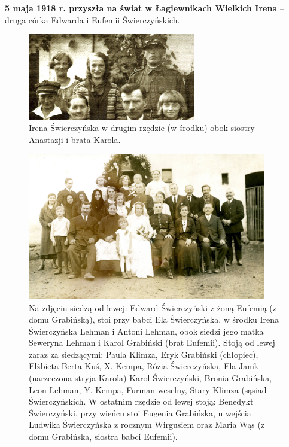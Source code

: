 \textbf{5 maja 1918 r. przyszła na świat w Łagiewnikach Wielkich Irena} -- druga córka Edwarda i Eufemii Świerczyńskich.

\begin{figure}[!h]
\begin{center}
\includegraphics[width=0.65\textwidth]{photo/irena_swierczynska_1.jpg}
\caption[Irena Świerczyńska obok siostry Anastazji i brata Karola]{Irena Świerczyńska w drugim rzędzie (w środku) obok siostry Anastazji i brata Karola.}
\label{rys:irena_swierczynska_1}
\end{center}
\end{figure}

\begin{figure}[!h]
\begin{center}
\includegraphics[width=0.93\textwidth]{photo/irena_antoni_lehman_slub.jpg}
\caption[Ślub Ireny i Antoniego Lehmanów]{Na zdjęciu siedzą od lewej: Edward Świerczyński z żoną Eufemią (z domu Grabińską), stoi przy babci Ela Świerczyńska, w środku Irena Świerczyńska Lehman i Antoni Lehman, obok siedzi jego matka Seweryna Lehman i Karol Grabiński (brat Eufemii). Stoją od lewej zaraz za siedzącymi: Paula Klimza, Eryk Grabiński (chłopiec), Elżbieta Berta Kuś, X. Kempa, Rózia Świerczyńska, Ela Janik (narzeczona stryja Karola) Karol Świerczyński, Bronia Grabińska, Leon Lehman, Y. Kempa, Furman weselny, Stary Klimza (sąsiad Świerczyńskich. W ostatnim rzędzie od lewej stoją: Benedykt Świerczyński, przy wieńcu stoi Eugenia Grabińska, u wejścia Ludwika Świerczyńska z rocznym Wirgusiem oraz Maria Wąs (z domu Grabińska, siostra babci Eufemii).}
\label{rys:irena_antoni_lehman_slub}
\end{center}
\end{figure}

